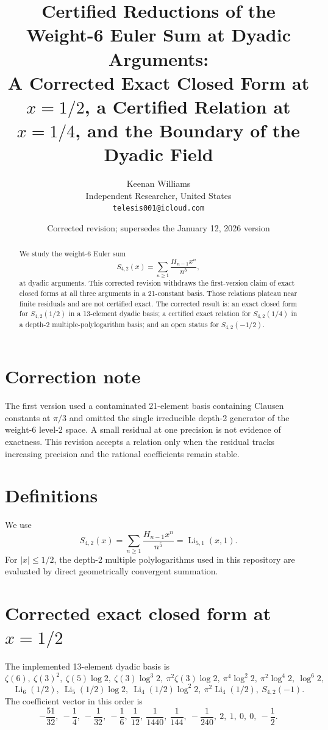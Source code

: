 \documentclass[11pt]{article}
\title{Certified Reductions of the Weight-6 Euler Sum at Dyadic Arguments:\\A Corrected Exact Closed Form at $x=1/2$, a Certified Relation at $x=1/4$, and the Boundary of the Dyadic Field}
\author{Keenan Williams\\Independent Researcher, United States\\\texttt{telesis001@icloud.com}}
\date{Corrected revision; supersedes the January 12, 2026 version}
\begin{document}
\maketitle

\begin{abstract}
We study the weight-6 Euler sum
\[
S_{4,2}(x)=\sum_{n\ge1}\frac{H_{n-1}x^n}{n^5},
\]
at dyadic arguments. This corrected revision withdraws the first-version claim of exact closed forms at all three arguments in a 21-constant basis. Those relations plateau near finite residuals and are not certified exact. The corrected result is: an exact closed form for $S_{4,2}(1/2)$ in a 13-element dyadic basis; a certified exact relation for $S_{4,2}(1/4)$ in a depth-2 multiple-polylogarithm basis; and an open status for $S_{4,2}(-1/2)$.
\end{abstract}

\section{Correction note}
The first version used a contaminated 21-element basis containing Clausen constants at $\pi/3$ and omitted the single irreducible depth-2 generator of the weight-6 level-2 space. A small residual at one precision is not evidence of exactness. This revision accepts a relation only when the residual tracks increasing precision and the rational coefficients remain stable.

\section{Definitions}
We use
\[
S_{4,2}(x)=\sum_{n\ge1}\frac{H_{n-1}x^n}{n^5}=\operatorname{Li}_{5,1}(x,1).
\]
For $|x|\le 1/2$, the depth-2 multiple polylogarithms used in this repository are evaluated by direct geometrically convergent summation.

\section{Corrected exact closed form at $x=1/2$}
The implemented 13-element dyadic basis is
\[
\zeta(6),\ \zeta(3)^2,\ \zeta(5)\log2,\ \zeta(3)\log^3 2,\ \pi^2\zeta(3)\log2,\ \pi^4\log^2 2,\ \pi^2\log^4 2,\ \log^6 2,
\]
\[
\operatorname{Li}_6(1/2),\ \operatorname{Li}_5(1/2)\log2,\ \operatorname{Li}_4(1/2)\log^2 2,\ \pi^2\operatorname{Li}_4(1/2),\ S_{4,2}(-1).
\]
The coefficient vector in this order is
\[
-\frac{51}{32},\ -\frac14,\ -\frac1{32},\ -\frac16,\ \frac1{12},\ \frac1{1440},\ \frac1{144},\ -\frac1{240},\ 2,\ 1,\ 0,\ 0,\ -\frac12.
\]
\end{document}
